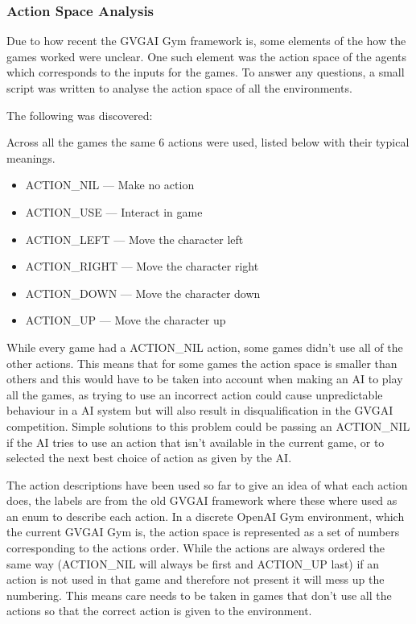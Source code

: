 \documentclass[a4paper]{article}
\begin{document}
\subsubsection{Action Space Analysis}
Due to how recent the GVGAI Gym framework is, some elements of the how the games worked were unclear.
One such element was the action space of the agents which corresponds to the inputs for the games.
To answer any questions, a small script was written to analyse the action space of all the environments.
\par
The following was discovered:
\begin{description}
\setlength{\itemsep}{0pt}
\setlength{\parskip}{0pt}
\item [Total number of actions]
Across all the games the same 6 actions were used, listed below with their typical meanings.
\begin{multicols}{2}
    \begin{itemize}[noitemsep,nolistsep]
        \item ACTION\_NIL --- Make no action
        \item ACTION\_USE --- Interact in game
        \item ACTION\_LEFT --- Move the character left
        \item ACTION\_RIGHT --- Move the character right
        \item ACTION\_DOWN --- Move the character down
        \item ACTION\_UP --- Move the character up
    \end{itemize}
\end{multicols}
\item [Not all games used all actions]
While every game had a ACTION\_NIL action, some games didn't use all of the other actions.
This means that for some games the action space is smaller than others and this would have to be taken into account when making an AI to play all the games, as trying to use an incorrect action could cause unpredictable behaviour in a AI system but will also result in disqualification in the GVGAI competition.
Simple solutions to this problem could be passing an ACTION\_NIL if the AI tries to use an action that isn't available in the current game, or to selected the next best choice of action as given by the AI\@.
\item [The Actions weren't numbered the same]
The action descriptions have been used so far to give an idea of what each action does, the labels are from the old GVGAI framework where these where used as an enum to describe each action.
In a discrete OpenAI Gym environment, which the current GVGAI Gym is, the action space is represented as a set of numbers corresponding to the actions order.
While the actions are always ordered the same way (ACTION\_NIL will always be first and ACTION\_UP last) if an action is not used in that game and therefore not present it will mess up the numbering.
This means care needs to be taken in games that don't use all the actions so that the correct action is given to the environment.
\end{description}
\end{document}
